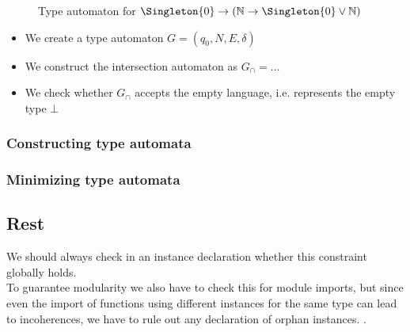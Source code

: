 \begin{figure}
  \centering
  \caption{Type automaton for $\Singleton{0} \to (\Nat \to \Singleton{0} \join \Nat)$}
  \label{fig:example-type-automaton}
\end{figure}

\begin{itemize}
  \item We create a type automaton $G = (q_0, N, E, \delta)$
  \item We construct the intersection automaton as $G_\cap = \dots$
  \item We check whether $G_\cap$ accepts the empty language, i.e. represents the empty type $\bot$
\end{itemize}

\subsubsection{Constructing type automata}
\subsubsection{Minimizing type automata}


\subsection{Rest}
We should always check in an instance declaration whether this constraint globally holds. \\
To guarantee modularity we also have to check this for module imports, but since even the import of functions using different instances for the same type can lead to incoherences, we have to rule out any declaration of orphan instances.
\cite{Kilpatrick2019-cy}.